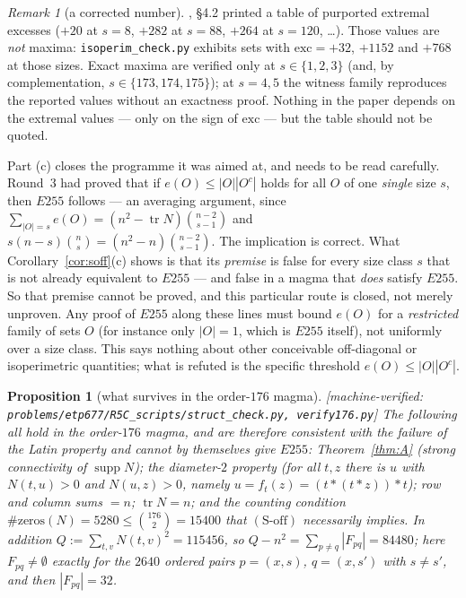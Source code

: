 \documentclass[11pt]{article}
\theoremstyle{plain}
\newtheorem{proposition}[theorem]{Proposition}
\theoremstyle{definition}
\theoremstyle{remark}
\newtheorem*{remark*}{Remark}
\numberwithin{equation}{section}
\newcommand{\op}{\mathbin{*}}
\newcommand{\supp}{\operatorname{supp}}
\newcommand{\tr}{\operatorname{tr}}
\newcommand{\statusbox}[1]{{\small\sloppy\textsf{[#1]}}}
\newcommand{\MV}[1]{\statusbox{machine-verified: \texttt{#1}}}
\begin{document}
\begin{remark*}[a corrected number]
\cite{R5C}, \S4.2 printed a table of purported extremal excesses
($+20$ at $s=8$, $+282$ at $s=88$, $+264$ at $s=120$, \dots). Those values are \emph{not}
maxima: \texttt{isoperim\_check.py} exhibits sets with $\mathrm{exc} = +32$, $+1152$ and
$+768$ at those sizes. Exact maxima are verified only at $s\in\{1,2,3\}$ (and, by
complementation, $s\in\{173,174,175\}$); at $s=4,5$ the witness family reproduces the
reported values without an exactness proof. Nothing in the paper depends on the extremal values ---
only on the sign of $\mathrm{exc}$ --- but the table should not be quoted.
\end{remark*}

Part (c) closes the programme it was aimed at, and needs to be read carefully. Round~3 had
proved
\cite{R3C} that if $e(O)\le|O||O^c|$ holds for all $O$ of one \emph{single} size $s$, then
$E255$ follows --- an averaging argument, since
$\sum_{|O|=s}e(O) = (n^2-\tr N)\binom{n-2}{s-1}$ and
$s(n-s)\binom ns = (n^2-n)\binom{n-2}{s-1}$. The implication is correct. What
Corollary~\ref{cor:soff}(c) shows is that its \emph{premise} is false for every size class
$s$ that is not already equivalent to $E255$ --- and false in a magma
that \emph{does} satisfy $E255$. So that premise cannot be proved, and this particular route
is closed, not merely unproven. Any proof of $E255$ along these lines must bound $e(O)$ for a
\emph{restricted} family of sets
$O$ (for instance only $|O|=1$, which is $E255$ itself), not uniformly over a size class.
This says nothing about other conceivable off-diagonal or isoperimetric quantities; what is
refuted is the specific threshold $e(O)\le|O||O^c|$.

\begin{proposition}[what survives in the order-$176$ magma]\label{prop:survives}
\MV{problems\slash etp677\slash R5C\_scripts\slash struct\_check.py, verify176.py}
The following all hold in the order-$176$ magma, and are therefore \emph{consistent} with the
failure of the Latin property and cannot by themselves give $E255$: Theorem~\ref{thm:A}
(strong connectivity of $\supp N$); the diameter-$2$ property (for all $t,z$ there is $u$
with $N(t,u)>0$ and $N(u,z)>0$, namely $u = f_t(z) = (t\op(t\op z))\op t$); row and column
sums $=n$; $\tr N = n$; and the counting condition
$\#\mathrm{zeros}(N) = 5280 \le \binom{176}{2} = 15400$ that $(\mathrm{S\text{-}off})$
necessarily implies. In addition $Q := \sum_{t,v}N(t,v)^2 = 115456$, so
$Q-n^2 = \sum_{p\ne q}|F_{pq}| = 84480$; here $F_{pq}\ne\emptyset$ exactly for the $2640$
ordered pairs $p = (x,s)$, $q = (x,s')$ with $s\ne s'$, and then $|F_{pq}| = 32$.
\end{proposition}
\end{document}
